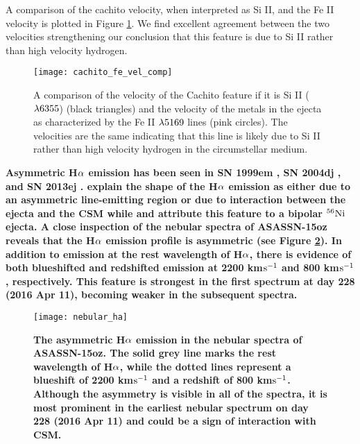 \documentclass[a4paper,fleqn,usenatbib]{mnras}
\begin{document}
A comparison of the cachito velocity, when interpreted as Si II, and the Fe II velocity is plotted in Figure \ref{fig:SiVelocity}.
We find excellent agreement between the two velocities strengthening our conclusion that this feature is due to Si II rather than high velocity hydrogen.
\begin{figure}
\begin{center}
\texttt{[image: cachito\_fe\_vel\_comp]}
\caption{A comparison of the velocity of the Cachito feature if it is Si II ($\rm{\lambda6355}$) (black triangles) and the velocity of the metals in the ejecta as characterized by the Fe II $\rm{\lambda5169}$ lines (pink circles).
The velocities are the same indicating that this line is likely due to Si II rather than high velocity hydrogen in the circumstellar medium.}
\label{fig:SiVelocity}
\end{center}
\end{figure}

\textbf{Asymmetric H$\rm{\alpha}$ emission has been seen in SN 1999em \citep{2001leonard}, SN 2004dj \citep{2005chugai}, and SN 2013ej \citep{2017utrobin}.
\citet{2001leonard} explain the shape of the H$\rm{\alpha}$ emission as either due to an asymmetric line-emitting region or due to interaction between the ejecta and the CSM while \citet{2005chugai} and \citet{2017utrobin} attribute this feature to a bipolar $\rm{^{56}Ni}$ ejecta. A close inspection of the nebular spectra of ASASSN-15oz reveals that the H$\rm{\alpha}$ emission profile is asymmetric (see Figure \ref{fig:nebHa}).
In addition to emission at the rest wavelength of H$\rm{\alpha}$, there is evidence of both blueshifted and redshifted emission at 2200 km$\rm{s^{-1}}$ and 800 km$\rm{s^{-1}}$, respectively. 
This feature is strongest in the first spectrum at day 228 (2016 Apr 11), becoming weaker in the subsequent spectra.}

\begin{figure}
\begin{center}
\texttt{[image: nebular\_ha]} %
\caption{\textbf{The asymmetric H$\rm{\alpha}$ emission in the nebular spectra of ASASSN-15oz. 
The solid grey line marks the rest wavelength of H$\rm{\alpha}$, while the dotted lines represent a blueshift of 2200 km$\rm{s^{-1}}$ and a redshift of 800 km$\rm{s^{-1}}$.
Although the asymmetry is visible in all of the spectra, it is most prominent in the earliest nebular spectrum on day 228 (2016 Apr 11) and could be a sign of interaction with CSM.
}}
\label{fig:nebHa}
\end{center}
\end{figure}
\end{document}
